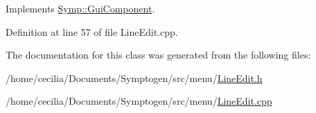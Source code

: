 Implements \hyperlink{class_symp_1_1_gui_component_add73e07ea0a3c9c1c90640e783a3b5de}{Symp\-::\-Gui\-Component}.



Definition at line 57 of file Line\-Edit.\-cpp.



The documentation for this class was generated from the following files\-:\begin{DoxyCompactItemize}
\item 
/home/cecilia/\-Documents/\-Symptogen/src/menu/\hyperlink{_line_edit_8h}{Line\-Edit.\-h}\item 
/home/cecilia/\-Documents/\-Symptogen/src/menu/\hyperlink{_line_edit_8cpp}{Line\-Edit.\-cpp}\end{DoxyCompactItemize}
